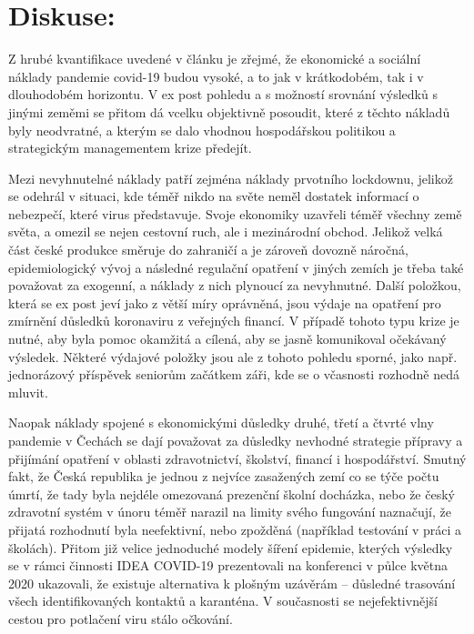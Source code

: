 \section*{Diskuse:} 
Z hrubé kvantifikace uvedené v článku je zřejmé, že ekonomické a sociální náklady pandemie covid-19 budou vysoké, a to jak v krátkodobém, tak i v dlouhodobém horizontu. V ex post pohledu a s možností srovnání výsledků s jinými zeměmi se přitom dá vcelku objektivně posoudit, které z těchto nákladů byly neodvratné, a kterým se dalo vhodnou hospodářskou politikou a strategickým managementem krize předejít.

Mezi nevyhnutelné náklady patří zejména náklady prvotního lockdownu, jelikož se odehrál v situaci, kde téměř nikdo na světe neměl dostatek informací o nebezpečí, které virus představuje. Svoje ekonomiky uzavřeli téměř všechny země světa, a omezil se nejen cestovní ruch, ale i mezinárodní obchod. Jelikož velká část české produkce směruje do zahraničí a je zároveň dovozně náročná, epidemiologický vývoj a následné regulační opatření v jiných zemích je třeba také považovat za exogenní, a náklady z nich plynoucí za nevyhnutné. Další položkou, která se ex post jeví jako z větší míry oprávněná, jsou výdaje na opatření pro zmírnění důsledků koronaviru z veřejných financí. V případě tohoto typu krize je nutné, aby byla pomoc okamžitá a cílená, aby se jasně komunikoval očekávaný výsledek. Některé výdajové položky jsou ale z tohoto pohledu sporné, jako např. jednorázový příspěvek seniorům začátkem záři, kde se o včasnosti rozhodně nedá mluvit.

Naopak náklady spojené s ekonomickými důsledky druhé, třetí a čtvrté vlny pandemie v Čechách se dají považovat za důsledky nevhodné strategie přípravy a přijímání opatření v oblasti zdravotnictví, školství, financí i hospodářství. Smutný fakt, že Česká republika je jednou z nejvíce zasažených zemí co se týče počtu úmrtí, že tady byla nejdéle omezovaná prezenční školní docházka, nebo že český zdravotní systém v únoru téměř narazil na limity svého fungování naznačují, že přijatá rozhodnutí byla neefektivní, nebo zpožděná (například testování v práci a školách). Přitom již velice jednoduché modely šíření epidemie, kterých výsledky se v rámci činnosti IDEA COVID-19 prezentovali na konferenci v půlce května 2020 ukazovali, že existuje alternativa k plošným uzávěrám – důsledné trasování všech identifikovaných kontaktů a karanténa. V současnosti se nejefektivnější cestou pro potlačení viru stálo očkování. 

